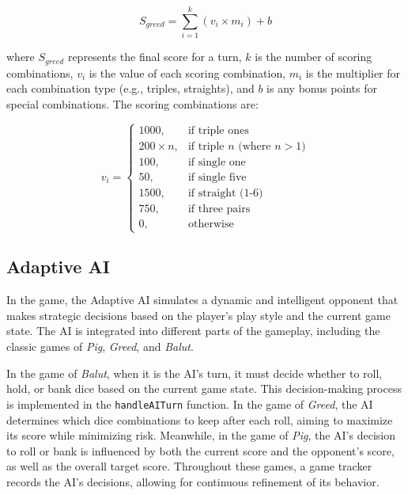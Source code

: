 \begin{equation}
    S_{greed} = \sum_{i=1}^{k} (v_i \times m_i) + b
\end{equation}

where $S_{greed}$ represents the final score for a turn, $k$ is the number of scoring combinations, $v_i$ is the value of each scoring combination, $m_i$ is the multiplier for each combination type (e.g., triples, straights), and $b$ is any bonus points for special combinations. The scoring combinations are:

\begin{equation}
    v_i = \begin{cases}
        1000, & \text{if triple ones} \\
        200 \times n, & \text{if triple } n \text{ (where } n > 1\text{)} \\
        100, & \text{if single one} \\
        50, & \text{if single five} \\
        1500, & \text{if straight (1-6)} \\
        750, & \text{if three pairs} \\
        0, & \text{otherwise}
    \end{cases}
\end{equation}


\subsection{Adaptive AI}
\label{subsec:adaptive_ai}

In the game, the Adaptive AI simulates a dynamic and intelligent opponent that makes strategic decisions based on the player's play style and the current game state. The AI is integrated into different parts of the gameplay, including the classic games of \emph{Pig}, \emph{Greed}, and \emph{Balut}.

In the game of \emph{Balut}, when it is the AI's turn, it must decide whether to roll, hold, or bank dice based on the current game state. This decision-making process is implemented in the \texttt{handleAITurn} function. In the game of \emph{Greed}, the AI determines which dice combinations to keep after each roll, aiming to maximize its score while minimizing risk. Meanwhile, in the game of \emph{Pig}, the AI's decision to roll or bank is influenced by both the current score and the opponent's score, as well as the overall target score. Throughout these games, a game tracker records the AI's decisions, allowing for continuous refinement of its behavior.

